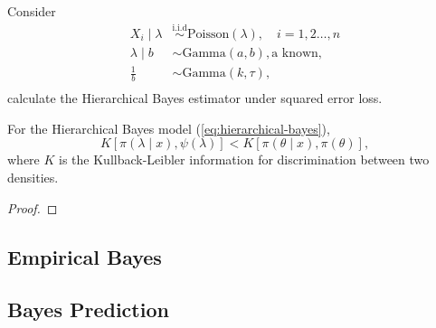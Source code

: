 \begin{example}
	Consider
	\begin{equation}
		\begin{aligned}
			X_i\mid\lambda & \stackrel{\text{i.i.d}}{\sim} \text{Poisson}\left(\lambda\right),\quad i=1,2\ldots,n \\
			\lambda\mid b  & \sim \text{Gamma}\left(a,b\right), \text{a known},                                   \\
			\frac{1}{b}    & \sim \text{Gamma}\left(k,\tau\right),                                                \\
		\end{aligned}
	\end{equation}
	calculate the Hierarchical Bayes estimator under squared error loss.
\end{example}

\begin{theorem}
	For the Hierarchical Bayes model (\ref{eq:hierarchical-bayes}),
	\begin{equation}
		K\left[\pi\left(\lambda\mid x\right),\psi\left(\lambda\right)\right] < K\left[\pi\left(\theta\mid x\right),\pi\left(\theta\right)\right],
	\end{equation}
	where $K$ is the Kullback-Leibler information for discrimination between two densities.
\end{theorem}

\begin{proof}

\end{proof}

\begin{remark}

\end{remark}

\subsection{Empirical Bayes}

\subsection{Bayes Prediction}
